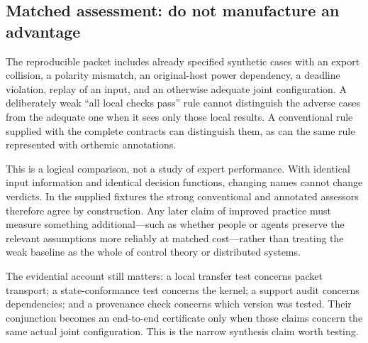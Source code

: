 \subsection{Matched assessment: do not manufacture an advantage}
The reproducible packet includes already specified synthetic cases with an export collision, a polarity mismatch, an original-host power dependency, a deadline violation, replay of an input, and an otherwise adequate joint configuration. A deliberately weak ``all local checks pass'' rule cannot distinguish the adverse cases from the adequate one when it sees only those local results. A conventional rule supplied with the complete contracts can distinguish them, as can the same rule represented with orthemic annotations.

This is a logical comparison, not a study of expert performance. With identical input information and identical decision functions, changing names cannot change verdicts. In the supplied fixtures the strong conventional and annotated assessors therefore agree by construction. Any later claim of improved practice must measure something additional---such as whether people or agents preserve the relevant assumptions more reliably at matched cost---rather than treating the weak baseline as the whole of control theory or distributed systems.

The evidential account still matters: a local transfer test concerns packet transport; a state-conformance test concerns the kernel; a support audit concerns dependencies; and a provenance check concerns which version was tested. Their conjunction becomes an end-to-end certificate only when those claims concern the same actual joint configuration. This is the narrow synthesis claim worth testing.
